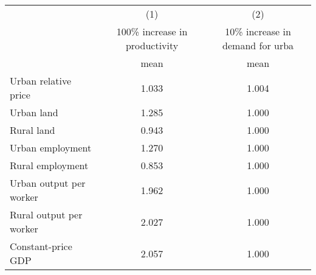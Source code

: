 {
\def\sym#1{\ifmmode^{#1}\else\(^{#1}\)\fi}
\begin{tabular}{l*{2}{c}}
\hline\hline
                    &\multicolumn{1}{c}{(1)}&\multicolumn{1}{c}{(2)}\\
                    &100\% increase in productivity&10\% increase in demand for urba\\
                    &        mean&        mean\\
\hline
Urban relative price&       1.033&       1.004\\
Urban land          &       1.285&       1.000\\
Rural land          &       0.943&       1.000\\
Urban employment    &       1.270&       1.000\\
Rural employment    &       0.853&       1.000\\
Urban output per worker&       1.962&       1.000\\
Rural output per worker&       2.027&       1.000\\
Constant-price GDP  &       2.057&       1.000\\
\hline\hline
\end{tabular}
}
